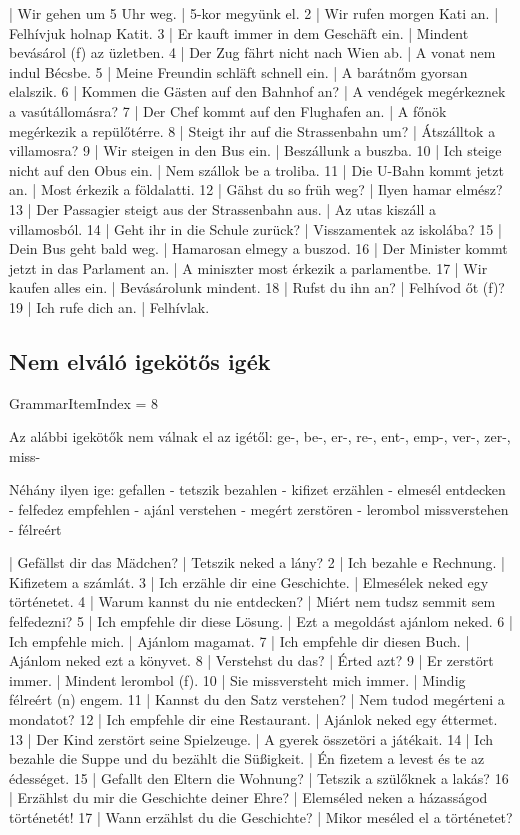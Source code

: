 \documentclass{article}
\newenvironment{desc}{\verbatim}{\endverbatim}
\newenvironment{exmp}{\verbatim}{\endverbatim}
\begin{document}
\begin{exmp}
1 | Wir gehen um 5 Uhr weg. | 5-kor megyünk el.
2 | Wir rufen morgen Kati an. | Felhívjuk holnap Katit.
3 | Er kauft immer in dem Geschäft ein. | Mindent bevásárol (f) az üzletben.
4 | Der Zug fährt nicht nach Wien ab. | A  vonat nem indul Bécsbe.
5 | Meine Freundin schläft schnell ein. | A barátnőm gyorsan elalszik.
6 | Kommen die Gästen auf den Bahnhof an? | A vendégek megérkeznek a vasútállomásra?
7 | Der Chef kommt auf den Flughafen an. | A főnök megérkezik a repülőtérre.
8 | Steigt ihr auf die Strassenbahn um? | Átszálltok a villamosra?
9 | Wir steigen in den Bus ein. | Beszállunk a buszba.
10 | Ich steige nicht auf den Obus ein. | Nem szállok be a troliba.
11 | Die U-Bahn kommt jetzt an. | Most érkezik a földalatti.
12 | Gähst du so früh weg? | Ilyen hamar elmész?
13 | Der Passagier steigt aus der Strassenbahn aus. | Az utas kiszáll a villamosból.
14 | Geht ihr in die Schule zurück? | Visszamentek az iskolába?
15 | Dein Bus geht bald weg. | Hamarosan elmegy a buszod.
16 | Der Minister kommt jetzt in das Parlament an. | A miniszter most érkezik a parlamentbe.
17 | Wir kaufen alles ein. | Bevásárolunk mindent.
18 | Rufst du ihn an? | Felhívod őt (f)?
19 | Ich rufe dich an. | Felhívlak.
\end{exmp}

\subsection{Nem elváló igekötős igék}

GrammarItemIndex = 8

\begin{desc}
Az alábbi igekötők nem válnak el az igétől:
ge-, be-, er-, re-, ent-, emp-, ver-, zer-, miss-

Néhány ilyen ige:
gefallen - tetszik
bezahlen - kifizet
erzählen - elmesél
entdecken - felfedez
empfehlen - ajánl
verstehen - megért
zerstören - lerombol
missverstehen - félreért
\end{desc}

\begin{exmp}
1 | Gefällst dir das Mädchen? | Tetszik neked a lány?
2 | Ich bezahle e Rechnung. | Kifizetem a számlát.
3 | Ich erzähle dir eine Geschichte. | Elmesélek neked egy történetet.
4 | Warum kannst du nie entdecken? | Miért nem tudsz semmit sem felfedezni?
5 | Ich empfehle dir diese Lösung. | Ezt a megoldást ajánlom neked.
6 | Ich empfehle mich. | Ajánlom magamat.
7 | Ich empfehle dir diesen Buch. | Ajánlom neked ezt a könyvet.
8 | Verstehst du das? | Érted azt?
9 | Er zerstört immer. | Mindent lerombol (f).
10 | Sie missversteht mich immer. | Mindig félreért (n) engem.
11 | Kannst du den Satz verstehen? | Nem tudod megérteni a mondatot?
12 | Ich empfehle dir eine Restaurant. | Ajánlok neked egy éttermet.
13 | Der Kind zerstört seine Spielzeuge. | A gyerek összetöri a játékait.
14 | Ich bezahle die Suppe und du bezählt die Süßigkeit. | Én fizetem a levest és te az édességet.
15 | Gefallt den Eltern die Wohnung? | Tetszik a szülőknek a lakás?
16 | Erzählst du mir die Geschichte deiner Ehre? | Elemséled neken a házasságod történetét!
17 | Wann erzählst du die Geschichte? | Mikor meséled el a történetet?
\end{exmp}
\end{document}
